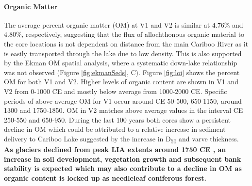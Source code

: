 \documentclass[Royal,times,doublespace,sageh]{sagej}
\begin{document}
\hypertarget{organic-matter}{%
\paragraph{Organic Matter}\label{organic-matter}}

The average percent organic matter (OM) at V1 and V2 is similar at
4.76\% and 4.80\%, respectively, suggesting that the flux of
allochthonous organic material to the core locations is not dependent on
distance from the main Cariboo River as it is easily transported through
the lake due to low density. This is also supported by the Ekman OM
spatial analysis, where a systematic down-lake relationship was not
observed (Figure \ref{fig:ekmanSeds}, C). Figure \ref{fig:loi} shows the
percent OM for both V1 and V2. Higher levels of organic content are
shown in V1 and V2 from 0-1000 CE and mostly below average from
1000-2000 CE. Specific periods of above average OM for V1 occur around
CE 50-500, 650-1150, around 1300 and 1750-1850. OM in V2 matches above
average values in the interval CE 250-550 and 650-950. During the last
100 years both cores show a persistent decline in OM which could be
attributed to a relative increase in sediment delivery to Cariboo Lake
suggested by the increase in D\textsubscript{50} and varve thickness.
\textbf{As glaciers declined from peak LIA extents around 1750 CE
\citep{Leonard1997, Luckman2000g}, an increase in soil development,
vegetation growth and subsequent bank stability is expected which may
also contribute to a decline in OM as organic content is locked up as
needleleaf coniferous forest.}
\end{document}
